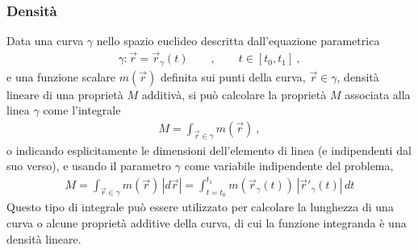 \documentclass[letterpaper,10pt,italian]{jupyterBook}
\begin{document}
\subsubsection{Densità}
\label{\detokenize{ch/vector-calculus/integrals:densita}}\label{\detokenize{ch/vector-calculus/integrals:vector-calculus-integrals-density}}
\sphinxAtStartPar
Data una curva \(\gamma\) nello spazio euclideo descritta dall’equazione parametrica
\begin{equation*}
\begin{split}\gamma: \vec{r} = \vec{r}_{\gamma}(t) \qquad  , \qquad t \in [t_0, t_1] \ ,\end{split}
\end{equation*}
\sphinxAtStartPar
e una funzione scalare \(m(\vec{r})\) definita sui punti della curva, \(\vec{r} \in \gamma\), densità lineare di una proprietà \(M\) additivà, si può calcolare la proprietà \(M\) associata alla linea \(\gamma\) come l’integrale
\begin{equation*}
\begin{split}M = \int_{\vec{r} \in \gamma} m(\vec{r}) \ ,\end{split}
\end{equation*}
\sphinxAtStartPar
o indicando esplicitamente le dimensioni dell’elemento di linea (e indipendenti dal suo verso), e usando il parametro \(\gamma\) come variabile indipendente del problema,
\begin{equation*}
\begin{split}M = \int_{\vec{r} \in \gamma} m (\vec{r}) \, |d \vec{r}| = \int_{t = t_0}^{t_1} m (\vec{r}_{\gamma}(t)) \, |\vec{r}'_{\gamma}(t)| \, dt\end{split}
\end{equation*}
\sphinxAtStartPar
Questo tipo di integrale può essere utilizzato per calcolare la lunghezza di una curva o alcune proprietà additive della curva, di cui la funzione integranda è una densità lineare.
\label{ch/vector-calculus/integrals:example-0}
\end{document}
